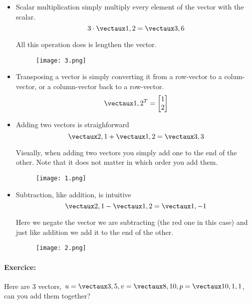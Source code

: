 \documentclass{article}
\begin{document}
\begin{itemize}
\item \color{rooj}  Scalar multiplication \color{black} simply multiply every element of the vector with the scalar.
\[
3 \cdot \vect{1 , 2} = \vect{3 , 6}
\]

\begin{minipage}{0.45\textwidth}
\begin{flushleft}
All this operation does is lengthen the vector. 
\end{flushleft}
\end{minipage} \hfill
\begin{minipage}{0.45\textwidth}
\begin{figure}[H]
\texttt{[image: 3.png]}
\end{figure}
\end{minipage}
\item

 \color{pers} Transposing \color{black} a vector is simply converting it from a row-vector to a colum-vector, or a column-vector back to a row-vector.
\[
\vect{1 , 2}^T = \icol{1 \\ 2}
\]

\item \color{groen} Adding \color{black} two vectors is straighforward 
\[
\vect{2 , 1} + \vect{1 , 2} = \vect{3  , 3}
\]

\begin{minipage}{0.45\textwidth}
\begin{flushleft}
Visually, when adding two vectors you simply add one to the end of the other. Note that it does not matter in which order you add them. 
\end{flushleft}
\end{minipage} \hfill
\begin{minipage}{0.45\textwidth}
\begin{figure}[H]
\texttt{[image: 1.png]}
\end{figure}
\end{minipage}

\item \color{blou} Subtraction\color{black}, like addition, is intuitive
\[
\vect{2 , 1} - \vect{1  , 2} = \vect{1 , -1}
\]

\begin{minipage}{0.45\textwidth}
\begin{flushleft}
Here we negate the vector we are subtracting (the red one in this case) and just like addition we add it to the end of the other. 
	
\end{flushleft}
\end{minipage} \hfill
\begin{minipage}{0.45\textwidth}
\begin{flushleft}
\begin{figure}[H]
\texttt{[image: 2.png]}
\end{figure}
\end{flushleft}
\end{minipage}

\end{itemize}

\paragraph{Exercice: } 
Here are 3 vectors, $u = \vect{3 , 5}, v = \vect{8 , 10}, p = \vect{10, 1, 1}$, can you add them together?
\end{document}
